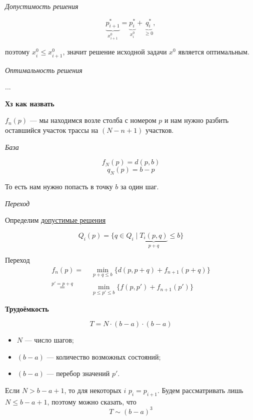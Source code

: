 \bigskip

\textit{Допустимость решения}

\[
\underbrace{p_{i+1}^*}_{x_{i+1}^0} = \underbrace{p_i^*}_{x_i^0} + \underbrace{q_i^*}_{\ge 0},
\]

поэтому $x_i^0 \le x_{i+1}^0$, значит решение исходной задачи $x^0$ является оптимальным.

\bigskip

\textit{Оптимальность решения}

...

\bigskip

\textbf{Хз как назвать}

$f_n(p)$ --- мы находимся возле столба с номером $p$ и нам нужно разбить оставшийся участок трассы на $(N - n + 1)$ участков.

\bigskip

\textit{База}

\[
f_N(p) = d(p, b)
\]
\[
q_N(p) = b - p
\]

То есть нам нужно попасть в точку $b$ за один шаг.

\bigskip

\textit{Переход}

Определим \underline{допустимые решения}

\[
Q_i(p) = \{q \in Q_i \; \big| \; \underbrace{T_i(p, q)}_{p+q} \le b\}
\]

Переход
\begin{align*}
	f_n(p) =& \; \min_{p+q \le b} \{d(p, p + q) + f_{n+1}(p+q)\} \\
	\stackrel{p' = p + q}{=}& \; \min_{p \le p' \le b} \{f(p, p') + f_{n+1}(p')\}	
\end{align*}

\bigskip

\textbf{Трудоёмкость}

\[
T = N \cdot (b - a) \cdot (b - a)
\]

\begin{itemize}[nosep]
	\item $N$ --- число шагов;
	
	\item $(b-a)$ --- количество возможных состояний;
	
	\item $(b-a)$ --- перебор значений $p'$.
\end{itemize}

Если $N > b - a + 1$, то для некоторых $i$ $p_i = p_{i+1}$. Будем рассматривать лишь $N \le b - a + 1$, поэтому можно сказать, что
\[
T \sim (b - a)^3
\]

